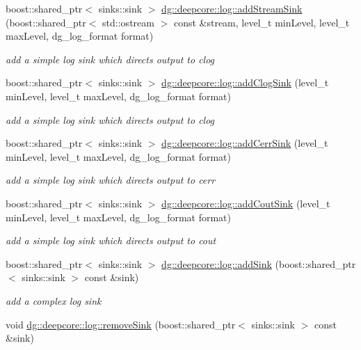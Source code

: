 \begin{DoxyCompactItemize}
boost\+::shared\+\_\+ptr$<$ sinks\+::sink $>$ \hyperlink{group___utility_module_gafe05a271abd51b48bd7dea8104793704}{dg\+::deepcore\+::log\+::add\+Stream\+Sink} (boost\+::shared\+\_\+ptr$<$ std\+::ostream $>$ const \&stream, level\+\_\+t min\+Level, level\+\_\+t max\+Level, dg\+\_\+log\+\_\+format format)
\begin{DoxyCompactList}\small\item\em add a simple log sink which directs output to clog \end{DoxyCompactList}\item 
boost\+::shared\+\_\+ptr$<$ sinks\+::sink $>$ \hyperlink{group___utility_module_ga9db801100c707255528a26083ff913df}{dg\+::deepcore\+::log\+::add\+Clog\+Sink} (level\+\_\+t min\+Level, level\+\_\+t max\+Level, dg\+\_\+log\+\_\+format format)
\begin{DoxyCompactList}\small\item\em add a simple log sink which directs output to clog \end{DoxyCompactList}\item 
boost\+::shared\+\_\+ptr$<$ sinks\+::sink $>$ \hyperlink{group___utility_module_ga185ecc92fb211afe98782f6f8b1d7e97}{dg\+::deepcore\+::log\+::add\+Cerr\+Sink} (level\+\_\+t min\+Level, level\+\_\+t max\+Level, dg\+\_\+log\+\_\+format format)
\begin{DoxyCompactList}\small\item\em add a simple log sink which directs output to cerr \end{DoxyCompactList}\item 
boost\+::shared\+\_\+ptr$<$ sinks\+::sink $>$ \hyperlink{group___utility_module_gab685eb3b065e30feda59f337bd016cb3}{dg\+::deepcore\+::log\+::add\+Cout\+Sink} (level\+\_\+t min\+Level, level\+\_\+t max\+Level, dg\+\_\+log\+\_\+format format)
\begin{DoxyCompactList}\small\item\em add a simple log sink which directs output to cout \end{DoxyCompactList}\item 
boost\+::shared\+\_\+ptr$<$ sinks\+::sink $>$ \hyperlink{group___utility_module_ga44021d28fcb20375f28dc6b2dfcc8e06}{dg\+::deepcore\+::log\+::add\+Sink} (boost\+::shared\+\_\+ptr$<$ sinks\+::sink $>$ const \&sink)
\begin{DoxyCompactList}\small\item\em add a complex log sink \end{DoxyCompactList}\item 
void \hyperlink{group___utility_module_ga6b5b9a8a9fb82aab4e0a9e4eaa77a4b9}{dg\+::deepcore\+::log\+::remove\+Sink} (boost\+::shared\+\_\+ptr$<$ sinks\+::sink $>$ const \&sink)

\end{DoxyCompactItemize}
